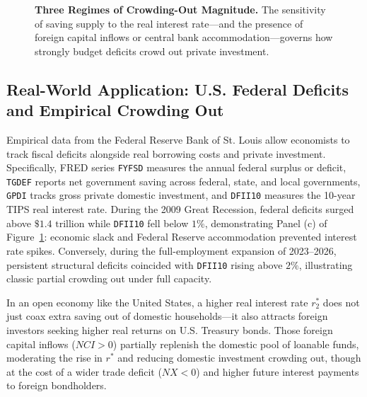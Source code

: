 \documentclass[11pt,letterpaper]{article}
\begin{document}
\begin{figure}[h!]
  \caption{\textbf{Three Regimes of Crowding-Out Magnitude.} The sensitivity of saving supply to the real interest rate—and the presence of foreign capital inflows or central bank accommodation—governs how strongly budget deficits crowd out private investment.}
  \label{fig:ch7-partial-crowding}
\end{figure}

\subsection*{Real-World Application: U.S. Federal Deficits and Empirical Crowding Out}
Empirical data from the Federal Reserve Bank of St. Louis allow economists to track fiscal deficits alongside real borrowing costs and private investment. Specifically, FRED series \texttt{FYFSD} measures the annual federal surplus or deficit, \texttt{TGDEF} reports net government saving across federal, state, and local governments, \texttt{GPDI} tracks gross private domestic investment, and \texttt{DFII10} measures the 10-year TIPS real interest rate. During the 2009 Great Recession, federal deficits surged above $\$1.4\text{ trillion}$ while \texttt{DFII10} fell below $1\%$, demonstrating Panel (c) of Figure~\ref{fig:ch7-partial-crowding}: economic slack and Federal Reserve accommodation prevented interest rate spikes. Conversely, during the full-employment expansion of 2023--2026, persistent structural deficits coincided with \texttt{DFII10} rising above $2\%$, illustrating classic partial crowding out under full capacity.

\begin{coreprinciple}
In an open economy like the United States, a higher real interest rate $r_2^*$ does not just coax extra saving out of domestic households—it also attracts foreign investors seeking higher real returns on U.S. Treasury bonds. Those foreign capital inflows ($NCI > 0$) partially replenish the domestic pool of loanable funds, moderating the rise in $r^*$ and reducing domestic investment crowding out, though at the cost of a wider trade deficit ($NX < 0$) and higher future interest payments to foreign bondholders.
\end{coreprinciple}
\end{document}
